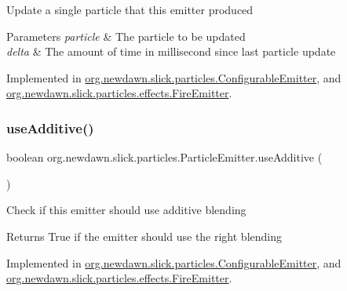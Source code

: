 Update a single particle that this emitter produced


\begin{DoxyParams}{Parameters}
{\em particle} & The particle to be updated \\
\hline
{\em delta} & The amount of time in millisecond since last particle update \\
\hline
\end{DoxyParams}


Implemented in \mbox{\hyperlink{classorg_1_1newdawn_1_1slick_1_1particles_1_1_configurable_emitter_afb381373acb3d59327528045c126d0fb}{org.\+newdawn.\+slick.\+particles.\+Configurable\+Emitter}}, and \mbox{\hyperlink{classorg_1_1newdawn_1_1slick_1_1particles_1_1effects_1_1_fire_emitter_a82aca444c3f089dd9d2c84f028e1f35b}{org.\+newdawn.\+slick.\+particles.\+effects.\+Fire\+Emitter}}.

\mbox{\label{interfaceorg_1_1newdawn_1_1slick_1_1particles_1_1_particle_emitter_a36f6bfeef5567c7c5b42c866a738cdb7}} 
\subsubsection{\texorpdfstring{use\+Additive()}{useAdditive()}}
{\footnotesize\ttfamily boolean org.\+newdawn.\+slick.\+particles.\+Particle\+Emitter.\+use\+Additive (\begin{DoxyParamCaption}{ }\end{DoxyParamCaption})}

Check if this emitter should use additive blending

\begin{DoxyReturn}{Returns}
True if the emitter should use the right blending 
\end{DoxyReturn}


Implemented in \mbox{\hyperlink{classorg_1_1newdawn_1_1slick_1_1particles_1_1_configurable_emitter_a417f9091bafd99eaed6984b22190b798}{org.\+newdawn.\+slick.\+particles.\+Configurable\+Emitter}}, and \mbox{\hyperlink{classorg_1_1newdawn_1_1slick_1_1particles_1_1effects_1_1_fire_emitter_afbace8ff2bcdb80e3ec810ffcdeaf521}{org.\+newdawn.\+slick.\+particles.\+effects.\+Fire\+Emitter}}.

